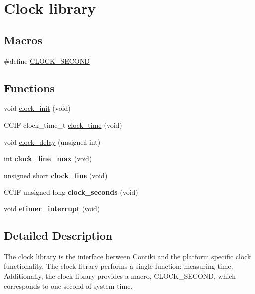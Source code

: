 \hypertarget{group__clock}{\section{Clock library}
\label{group__clock}
}
\subsection*{Macros}
\begin{DoxyCompactItemize}
\item 
\#define \hyperlink{group__clock_gae3ced0551b26c9b99cb45a86f34d100a}{C\-L\-O\-C\-K\-\_\-\-S\-E\-C\-O\-N\-D}
\end{DoxyCompactItemize}
\subsection*{Functions}
\begin{DoxyCompactItemize}
\item 
void \hyperlink{group__clock_ga78ab77b57cf2e00089f0a3a22508524c}{clock\-\_\-init} (void)
\item 
C\-C\-I\-F clock\-\_\-time\-\_\-t \hyperlink{group__clock_ga50c22f9b9d60dd1f9e59b63a3a6676b1}{clock\-\_\-time} (void)
\item 
void \hyperlink{group__clock_ga2a4bbf8e0008809dfd6c38040941a536}{clock\-\_\-delay} (unsigned int)
\item 
\hypertarget{group__clock_gae57f21c49f465372a8bf2ac3fbe03ba8}{int {\bfseries clock\-\_\-fine\-\_\-max} (void)}\label{group__clock_gae57f21c49f465372a8bf2ac3fbe03ba8}

\item 
\hypertarget{group__clock_gadca1ca5f3c484a278d6c4876f7c54bdb}{unsigned short {\bfseries clock\-\_\-fine} (void)}\label{group__clock_gadca1ca5f3c484a278d6c4876f7c54bdb}

\item 
\hypertarget{group__clock_ga8bbd5d5a773349139eee79d365af36ab}{C\-C\-I\-F unsigned long {\bfseries clock\-\_\-seconds} (void)}\label{group__clock_ga8bbd5d5a773349139eee79d365af36ab}

\item 
\hypertarget{group__clock_ga32d282ad58e03f762e3cbe30d41b024a}{void {\bfseries etimer\-\_\-interrupt} (void)}\label{group__clock_ga32d282ad58e03f762e3cbe30d41b024a}

\end{DoxyCompactItemize}


\subsection{Detailed Description}
The clock library is the interface between Contiki and the platform specific clock functionality. The clock library performs a single function\-: measuring time. Additionally, the clock library provides a macro, C\-L\-O\-C\-K\-\_\-\-S\-E\-C\-O\-N\-D, which corresponds to one second of system time.

